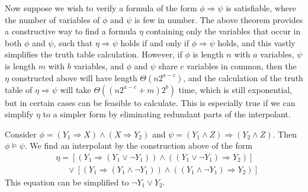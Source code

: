 Now suppose we wish to verify a formula of the form $\phi \Rightarrow \psi$ is satisfiable, where the number of variables of $\phi$ and $\psi$ is few in number. The above theorem provides a constructive way to find a formula $\eta$ containing only the variables that occur in both $\phi$ and $\psi$, such that $\eta \Rightarrow \psi$ holds if and only if $\phi \Rightarrow \psi$ holds, and this vastly simplifies the truth table calculation. However, if $\phi$ is length $n$ with $a$ variables, $\psi$ is length $m$ with $b$ variables, and $\phi$ and $\psi$ share $c$ variables in common, then the $\eta$ constructed above will have length $\Theta(n2^{a-c})$, and the calculation of the truth table of $\eta \Rightarrow \psi$ will take $\Theta((n2^{a-c} + m)2^b)$ time, which is still exponential, but in certain cases can be feasible to calculate. This is especially true if we can simplify $\eta$ to a simpler form by eliminating redundant parts of the interpolant.

\begin{example}
    Consider $\phi = (Y_1 \Rightarrow X) \wedge (X \Rightarrow Y_2)$ and $\psi = (Y_1 \wedge Z) \Rightarrow (Y_2 \wedge Z)$. Then $\phi \vDash \psi$. We find an interpolant by the construction above of the form
    \begin{align*}
        &\eta = [(Y_1 \Rightarrow (Y_1 \vee \neg Y_1)) \wedge ((Y_1 \vee \neg Y_1) \Rightarrow Y_2)]\\
        &\ \ \ \ \ \ \vee [(Y_1 \Rightarrow (Y_1 \wedge \neg Y_1)) \wedge ((Y_1 \wedge \neg Y_1) \Rightarrow Y_2)]
    \end{align*}
    This equation can be simplified to $\neg Y_1 \vee Y_2$.
\end{example}

